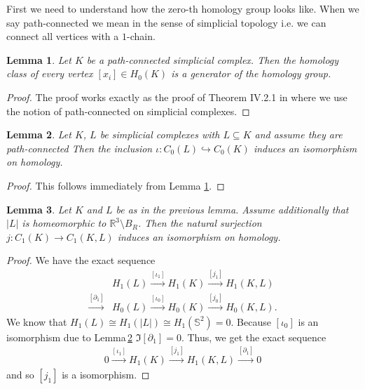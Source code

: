 \documentclass[12pt,a4paper]{article}
\numberwithin{equation}{subsection}
\newtheorem{lemma}{Lemma}[section]
\numberwithin{lemma}{subsection}
\theoremstyle{definition}
\newcommand{\real}{\mathbb{R}}
\begin{document}
First we need to understand how the zero-th homology group looks like. 
When we say path-connected we mean in the sense of simplicial topology i.e. 
we can connect all vertices with a $1$-chain.

\begin{lemma}\label{lem:zeroth_homology_group}
    Let $K$ be a path-connected simplicial complex. Then the homology class 
    of every vertex $[x_i] \in H_0(K)$ is a generator of the homology group.  
\end{lemma}
\begin{proof}
    The proof works exactly as the proof of Theorem IV.2.1 in 
    \cite{topology_and_geometry} where we use the notion of path-connected
    on simplicial complexes.
\end{proof}

\begin{lemma}\label{lem:inclusion_zeroth_homology}
    Let $K$, $L$ be simplicial complexes with $L \subseteq K$ and 
    assume they are path-connected  Then
    the inclusion $\iota: C_0(L) \hookrightarrow C_0(K)$ induces an isomorphism
    on homology.
\end{lemma}
\begin{proof}
    This follows immediately from Lemma \ref{lem:zeroth_homology_group}.
\end{proof}


\begin{lemma}\label{lem:isom_chains_and_relative_chains}
    Let $K$ and $L$ be as in the previous lemma. Assume additionally
    that $|L|$ is homeomorphic to $\real^3 \setminus B_R$.
    Then the natural surjection
    $j: C_1(K) \rightarrow C_1(K,L)$ induces an isomorphism on homology.
\end{lemma}
\begin{proof}
    We have the exact sequence 
    \begin{align*}
        &H_1(L) \xrightarrow{[\iota_1]} H_1(K) \xrightarrow{[j_1]} H_1(K,L) \\
        \xrightarrow{[\partial_1]} &H_0(L) \xrightarrow{[\iota_0]} H_0(K) 
            \xrightarrow{[j_0]} H_0(K,L).
    \end{align*}
    We know that $H_1(L) \cong H_1(|L|) \cong H_1(\mathbb{S}^2) = 0$. 
    Because $[\iota_0]$ is an isomorphism due to 
    Lemma\,\ref{lem:inclusion_zeroth_homology} $\Im [\partial_1] = 0$. 
    Thus, we get the exact sequence 
    \begin{align*}
        0 \xrightarrow{[\iota_1]} H_1(K) \xrightarrow{[j_1]} H_1(K,L)
        \xrightarrow{[\partial_1]} 0
    \end{align*}
    and so $[j_1]$ is a isomorphism.
\end{proof}
\end{document}
